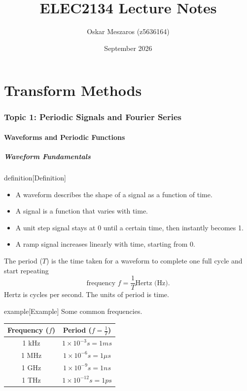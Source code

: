 \documentclass{article}
\title{ELEC2134 Lecture Notes}
\author{Oskar Meszaros (z5636164)}
\date{September 2026}
\begin{document}
\maketitle
\tableofcontents
\newpage

\part{Transform Methods}
\section{Topic 1: Periodic Signals and Fourier Series}
\subsection{Waveforms and Periodic Functions}
\subsubsection{Waveform Fundamentals}
\begin{callout}{definition}[Definition]
\label{definition:t1-d1}
\begin{itemize}
    \item A waveform describes the shape of a signal as a function of time.
    \item A signal is a function that varies with time.
    \item A unit step signal stays at 0 until a certain time, then instantly becomes 1.
    \item A ramp signal increases linearly with time, starting from 0.
\end{itemize}
\end{callout}

The period ($T$) is the time taken for a waveform to complete one full cycle and start repeating
\[
    \text{frequency } f=\frac{1}{T}\text{Hertz (Hz)}.
\]
Hertz is cycles per second. The units of period is time.

\begin{callout}{example}[Example]
\label{example:t1-e1}
Some common frequencies.

\begin{table}[H]
    \centering
    \label{tab:t1-t1}
    \begin{tabular}{c|c}
        Frequency ($f$) & Period ($f=\frac{1}{T}$) \\
        \hline
        \hline
        1 kHz & $1\times 10^{-3}s=1ms$\\
        1 MHz & $1\times 10^{-6}s=1\mu s$ \\
        1 GHz & $1\times 10^{-9}s=1ns$ \\
        1 THz & $1\times 10^{-12}s=1ps$
    \end{tabular}
\end{table}
\end{callout}
\end{document}
